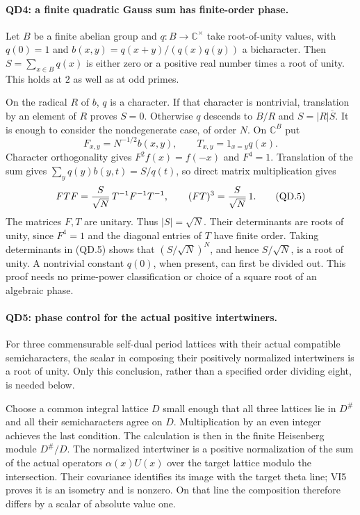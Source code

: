 \paragraph{QD4: a finite quadratic Gauss sum has finite-order phase.}
Let $B$ be a finite abelian group and $q:B\to\mathbb C^\times$
take root-of-unity values, with $q(0)=1$ and
$b(x,y)=q(x+y)/(q(x)q(y))$ a bicharacter.  Then
$S=\sum_{x\in B}q(x)$ is either zero or a positive real number
times a root of unity.  This holds at $2$ as well as at odd primes.

On the radical $R$ of $b$, $q$ is a character.  If that character
is nontrivial, translation by an element of $R$ proves $S=0$.
Otherwise $q$ descends to $B/R$ and $S=|R|\overline S$.
It is enough to consider the nondegenerate case, of order $N$.
On $\mathbb C^B$ put
\[
 F_{x,y}=N^{-1/2}b(x,y),\qquad T_{x,y}=1_{x=y}q(x).
\]
Character orthogonality gives $F^2f(x)=f(-x)$ and $F^4=1$.
Translation of the sum gives
$\sum_yq(y)b(y,t)=S/q(t)$, so direct matrix multiplication gives
\[
 FTF={S\over\sqrt N}\,T^{-1}F^{-1}T^{-1},
              \qquad (FT)^3={S\over\sqrt N}\,1.           \tag{QD.5}
\]
The matrices $F,T$ are unitary.  Thus $|S|=\sqrt N$.
Their determinants are roots of unity, since $F^4=1$ and the
diagonal entries of $T$ have finite order.  Taking determinants
in (QD.5) shows that $(S/\sqrt N)^N$, and hence $S/\sqrt N$,
is a root of unity.  A nontrivial constant $q(0)$, when present,
can first be divided out.  This proof needs no prime-power
classification or choice of a square root of an algebraic phase.

\paragraph{QD5: phase control for the actual positive intertwiners.}
For three commensurable self-dual period lattices with their
actual compatible semicharacters, the scalar in composing their
positively normalized intertwiners is a root of unity.  Only this
conclusion, rather than a specified order dividing eight, is
needed below.

Choose a common integral lattice $D$ small enough that all three
lattices lie in $D^\#$ and all their semicharacters agree on
$D$.  Multiplication by an even integer achieves the last
condition.  The calculation is then in the finite Heisenberg
module $D^\#/D$.  The normalized intertwiner is a positive
normalization of the sum of the actual operators
$\alpha(x)U(x)$ over the target lattice modulo the intersection.
Their covariance identifies its image with the target theta line;
VI5 proves it is an isometry and is nonzero.  On that line the
composition therefore differs by a scalar of absolute value one.

